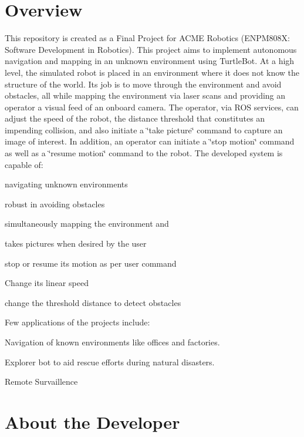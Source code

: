 {\tt } {\tt } {\tt }

\section*{Overview}

This repository is created as a Final Project for A\+C\+ME Robotics (E\+N\+P\+M808X\+: Software Development in Robotics). This project aims to implement autonomous navigation and mapping in an unknown environment using Turtle\+Bot. At a high level, the simulated robot is placed in an environment where it does not know the structure of the world. Its job is to move through the environment and avoid obstacles, all while mapping the environment via laser scans and providing an operator a visual feed of an onboard camera. The operator, via R\+OS services, can adjust the speed of the robot, the distance threshold that constitutes an impending collision, and also initiate a \char`\"{}take picture\char`\"{} command to capture an image of interest. In addition, an operator can initiate a \char`\"{}stop motion\char`\"{} command as well as a \char`\"{}resume motion\char`\"{} command to the robot. The developed system is capable of\+:


\begin{DoxyItemize}
\item navigating unknown environments
\item robust in avoiding obstacles
\item simultaneously mapping the environment and
\item takes pictures when desired by the user
\item stop or resume its motion as per user command
\item Change its linear speed
\item change the threshold distance to detect obstacles
\end{DoxyItemize}

Few applications of the projects include\+:
\begin{DoxyItemize}
\item Navigation of known environments like offices and factories.
\item Explorer bot to aid rescue efforts during natural disasters.
\item Remote Survaillence
\end{DoxyItemize}

  

\section*{About the Developer}

